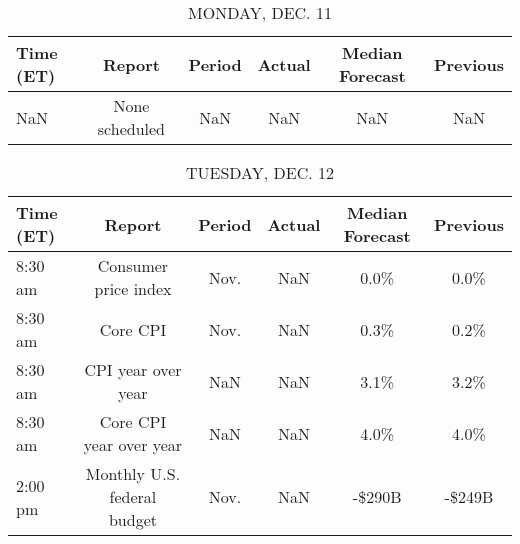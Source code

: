 \documentclass{article}%
\begin{document}
%
\normalsize%


\begin{table}[htbp]%
\caption{MONDAY, DEC. 11}%
\centering%
\begin{adjustbox}{width=1\textwidth}%
\begin{tabular}{lccccc}
\toprule
Time (ET) &         Report & Period & Actual & Median Forecast & Previous \\
\midrule
      NaN & None scheduled &    NaN &    NaN &             NaN &      NaN \\
\bottomrule
\end{tabular}
%
\end{adjustbox}%
\end{table}

%


\begin{table}[htbp]%
\caption{TUESDAY, DEC. 12}%
\centering%
\begin{adjustbox}{width=1\textwidth}%
\begin{tabular}{lccccc}
\toprule
Time (ET) &                      Report & Period & Actual & Median Forecast & Previous \\
\midrule
  8:30 am &        Consumer price index &   Nov. &    NaN &            0.0\% &     0.0\% \\
  8:30 am &                    Core CPI &   Nov. &    NaN &            0.3\% &     0.2\% \\
  8:30 am &          CPI year over year &    NaN &    NaN &            3.1\% &     3.2\% \\
  8:30 am &     Core CPI year over year &    NaN &    NaN &            4.0\% &     4.0\% \\
  2:00 pm & Monthly U.S. federal budget &   Nov. &    NaN &          -\$290B &   -\$249B \\
\bottomrule
\end{tabular}
%
\end{adjustbox}%
\end{table}

%
\end{document}
